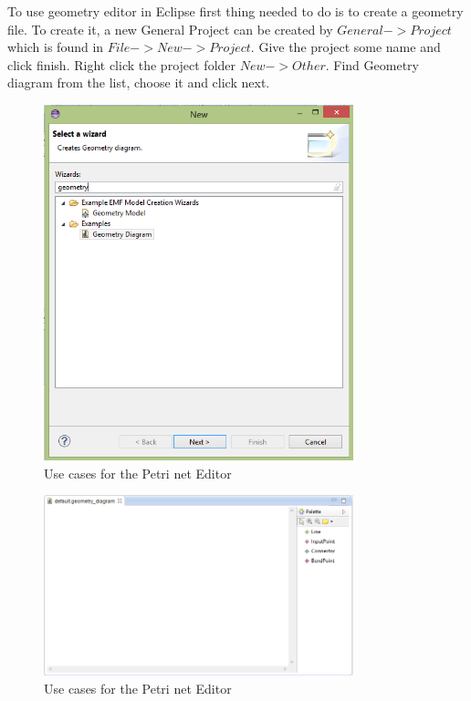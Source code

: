 To use geometry editor in Eclipse first thing needed to do is to create a geometry file. To create it, a new General Project can be created by $General->Project$ which is found in $File->New->Project$. Give the project some name and click finish. 
Right click the project folder $New->Other$. Find Geometry diagram from the list, choose it and click next.

\begin{figure}[htp]
\begin{center}
  \includegraphics[width=0.8\textwidth]{image/geometry1.png}
  \caption{Use cases for the Petri net Editor}
  \label{fig:geometry1}
\end{center}
\end{figure}

\begin{figure}[htp]
\begin{center}
  \includegraphics[width=0.8\textwidth]{image/geometry2.png}
  \caption{Use cases for the Petri net Editor}
  \label{fig:geometry2}
\end{center}
\end{figure}

